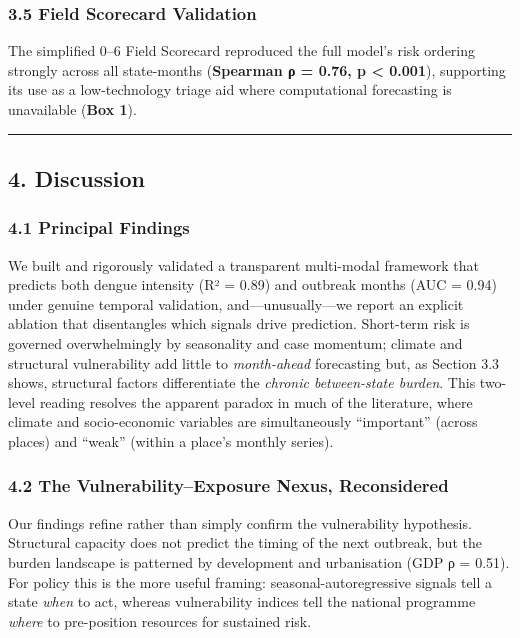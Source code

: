 \documentclass[
  10pt,
  twocolumn]{article}
\begin{document}
\subsubsection{3.5 Field Scorecard
Validation}\label{field-scorecard-validation}

The simplified 0--6 Field Scorecard reproduced the full model's risk
ordering strongly across all state-months (\textbf{Spearman ρ = 0.76, p
\textless{} 0.001}), supporting its use as a low-technology triage aid
where computational forecasting is unavailable (\textbf{Box 1}).

\begin{center}\rule{0.5\linewidth}{0.5pt}\end{center}

\subsection{4. Discussion}\label{discussion}

\subsubsection{4.1 Principal Findings}\label{principal-findings}

We built and rigorously validated a transparent multi-modal framework
that predicts both dengue intensity (R² = 0.89) and outbreak months (AUC
= 0.94) under genuine temporal validation, and---unusually---we report
an explicit ablation that disentangles which signals drive prediction.
Short-term risk is governed overwhelmingly by seasonality and case
momentum; climate and structural vulnerability add little to
\emph{month-ahead} forecasting but, as Section 3.3 shows, structural
factors differentiate the \emph{chronic between-state burden}. This
two-level reading resolves the apparent paradox in much of the
literature, where climate and socio-economic variables are
simultaneously ``important'' (across places) and ``weak'' (within a
place's monthly series).

\subsubsection{4.2 The Vulnerability--Exposure Nexus,
Reconsidered}\label{the-vulnerabilityexposure-nexus-reconsidered}

Our findings refine rather than simply confirm the vulnerability
hypothesis. Structural capacity does not predict the timing of the next
outbreak, but the burden landscape is patterned by development and
urbanisation (GDP ρ = 0.51). For policy this is the more useful framing:
seasonal-autoregressive signals tell a state \emph{when} to act, whereas
vulnerability indices tell the national programme \emph{where} to
pre-position resources for sustained risk.
\end{document}
